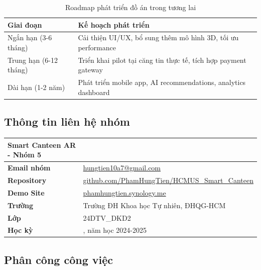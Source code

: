 \documentclass[12pt,a4paper]{article}
\begin{document}
\begin{table}[H]
\centering
\caption{Roadmap phát triển đồ án trong tương lai}
\label{tab:future-roadmap}
\begin{tabular}{@{}>{\raggedright\arraybackslash}p{3.5cm}>{\raggedright\arraybackslash}p{10.5cm}@{}}
\toprule
\textbf{Giai đoạn} & \textbf{Kế hoạch phát triển} \\
\midrule
Ngắn hạn (3-6 tháng) & Cải thiện UI/UX, bổ sung thêm mô hình 3D, tối ưu performance \\
Trung hạn (6-12 tháng) & Triển khai pilot tại căng tin thực tế, tích hợp payment gateway \\
Dài hạn (1-2 năm) & Phát triển mobile app, AI recommendations, analytics dashboard \\
\bottomrule
\end{tabular}
\end{table}

\subsection{Thông tin liên hệ nhóm}

\begin{table}[H]
\centering
\begin{tabular}{@{}>{\raggedright\arraybackslash}p{4cm}>{\raggedright\arraybackslash}p{10cm}@{}}
\toprule
\textbf{Smart Canteen AR - Nhóm 5} & \\
\midrule
\textbf{Email nhóm} & \href{mailto:hungtien10a7@gmail.com}{hungtien10a7@gmail.com} \\
\textbf{Repository} & \href{https://github.com/PhamHungTien/HCMUS_Smart_Canteen}{github.com/PhamHungTien/HCMUS\_Smart\_Canteen} \\
\textbf{Demo Site} & \href{https://phamhungtien.synology.me}{phamhungtien.synology.me} \\
\textbf{Trường} & Trường ĐH Khoa học Tự nhiên, ĐHQG-HCM \\
\textbf{Lớp} & 24DTV\_DKD2 \\
\textbf{Học kỳ} & 3, năm học 2024-2025 \\
\bottomrule
\end{tabular}
\end{table}

\subsection{Phân công công việc}
\end{document}
